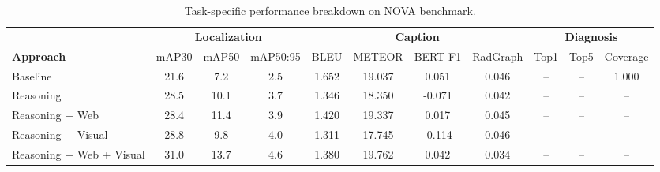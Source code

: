 \begin{table}[t]
  \caption{Task-specific performance breakdown on NOVA benchmark.}
  \label{tab:task_breakdown}
  \centering
  \begin{tabular}{l|ccc|cccc|ccc}
    \hline
    & \multicolumn{3}{c|}{\textbf{Localization}} & \multicolumn{4}{c|}{\textbf{Caption}} & \multicolumn{3}{c}{\textbf{Diagnosis}} \\
    \textbf{Approach} & mAP30 & mAP50 & mAP50:95 & BLEU & METEOR & BERT-F1 & RadGraph & Top1 & Top5 & Coverage \\
    \hline
    Baseline             & 21.6 & 7.2 & 2.5 & 1.652 & 19.037 & 0.051 & 0.046 & -- & -- & 1.000 \\
    Reasoning            & 28.5 & 10.1 & 3.7 & 1.346 & 18.350 & -0.071 & 0.042 & -- & -- & -- \\
    Reasoning + Web      & 28.4 & 11.4 & 3.9 & 1.420 & 19.337 & 0.017 & 0.045 & -- & -- & -- \\
    Reasoning + Visual   & 28.8 & 9.8 & 4.0 & 1.311 & 17.745 & -0.114 & 0.046 & -- & -- & -- \\
    Reasoning + Web + Visual & 31.0 & 13.7 & 4.6 & 1.380 & 19.762 & 0.042 & 0.034 & -- & -- & -- \\
    \hline
  \end{tabular}
\end{table}